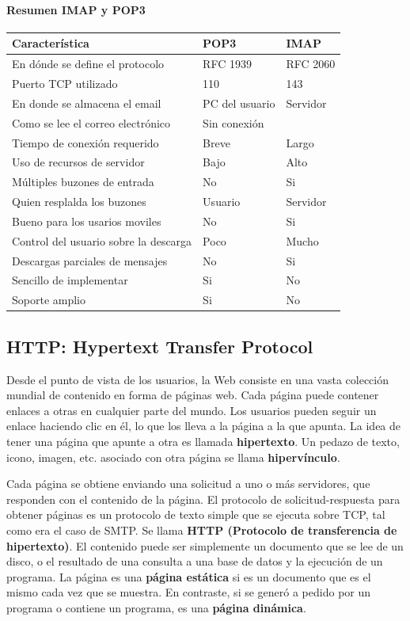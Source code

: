 \paragraph{Resumen IMAP y POP3}
\begin{center}
  \begin{tabularx}{0.8\textwidth}{l|l|l}
    \textbf{Característica} & \textbf{POP3} & \textbf{IMAP} \\
    \hline
    En dónde se define el protocolo & RFC 1939 & RFC 2060 \\
    \hline
    Puerto TCP utilizado & 110 & 143 \\
    \hline
    En donde se almacena el email & PC del usuario & Servidor \\
    Como se lee el correo electrónico  & Sin conexión & \\
    Tiempo de conexión requerido & Breve & Largo \\
    \hline
    Uso de recursos de servidor & Bajo & Alto \\
    \hline
    Múltiples buzones de entrada & No & Si \\
    \hline
    Quien resplalda los buzones & Usuario & Servidor \\
    \hline
    Bueno para los usarios moviles & No & Si \\
    \hline
    Control del usuario sobre la descarga & Poco & Mucho \\
    \hline
    Descargas parciales de mensajes & No & Si \\
    Sencillo de implementar & Si & No \\
    \hline
    Soporte amplio & Si & No \\
  \end{tabularx}
\end{center}

\subsection{HTTP: Hypertext Transfer Protocol}
Desde el punto de vista de los usuarios, la Web consiste en una vasta colección mundial de contenido en forma de páginas web. Cada página puede contener enlaces a otras en cualquier parte del mundo. Los usuarios pueden seguir un enlace haciendo clic en él, lo que los lleva a la página a la que apunta. La idea de tener una página que apunte a otra es llamada \textbf{hipertexto}. Un pedazo de texto, icono, imagen, etc. asociado con otra página se llama \textbf{hipervínculo}.

Cada página se obtiene enviando una solicitud a uno o más servidores, que responden con el contenido de la página. El protocolo de solicitud-respuesta para obtener páginas es un protocolo de texto simple que se ejecuta sobre TCP, tal como era el caso de SMTP. Se llama \textbf{HTTP (Protocolo de transferencia de hipertexto)}. El contenido puede ser simplemente un documento que se lee de un disco, o el resultado de una consulta a una base de datos y la ejecución de un programa. La página es una \textbf{página estática} si es un documento que es el mismo cada vez que se muestra. En contraste, si se generó a pedido por un programa o contiene un programa, es una \textbf{página dinámica}.

